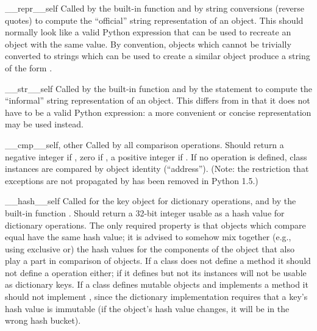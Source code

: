 \begin{methoddescni}{__repr__}{self}
Called by the  built-in function
and by string conversions (reverse quotes) to compute the ``official''
string representation of an object.  This should normally look like a
valid Python expression that can be used to recreate an object with
the same value.  By convention, objects which cannot be trivially
converted to strings which can be used to create a similar object
produce a string of the form .
\end{methoddescni}

\begin{methoddescni}{__str__}{self}
Called by the  built-in function and
by the  statement to compute the
``informal'' string representation of an object.  This differs from
 in that it does not have to be a valid Python
expression: a more convenient or concise representation may be used
instead.
\end{methoddescni}

\begin{methoddescni}{__cmp__}{self, other}
Called by all comparison operations.  Should return a negative integer if
,  zero if , a positive integer if
.  If no  operation is defined, class
instances are compared by object identity (``address'').
(Note: the restriction that exceptions are not propagated by
 has been removed in Python 1.5.)
\end{methoddescni}

\begin{methoddescni}{__hash__}{self}
Called for the key object for dictionary
operations, and by the built-in function
.  Should return a 32-bit integer
usable as a hash value
for dictionary operations.  The only required property is that objects
which compare equal have the same hash value; it is advised to somehow
mix together (e.g., using exclusive or) the hash values for the
components of the object that also play a part in comparison of
objects.  If a class does not define a  method it should
not define a  operation either; if it defines
 but not  its instances will not be
usable as dictionary keys.  If a class defines mutable objects and
implements a  method it should not implement
, since the dictionary implementation requires that
a key's hash value is immutable (if the object's hash value changes, it
will be in the wrong hash bucket).
\end{methoddescni}

